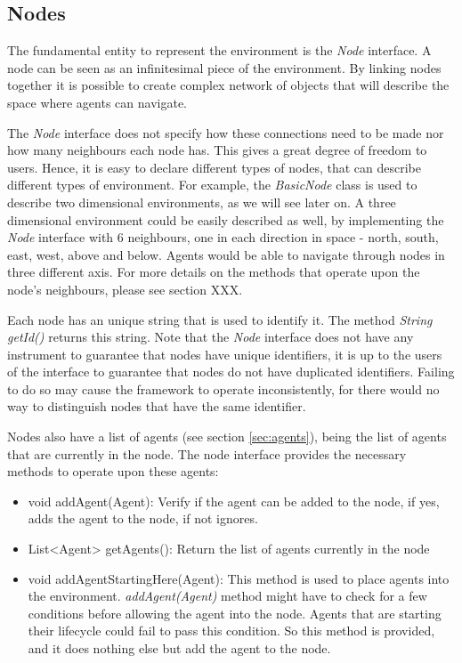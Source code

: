 \subsection{Nodes}

The fundamental entity to represent the environment is the \emph{Node} interface. A node can be seen as an infinitesimal piece of the environment. By linking nodes together it is possible to create complex network of objects that will describe the space where agents can navigate.

The \emph{Node} interface does not specify how these connections need to be made nor how many neighbours each node has. This gives a great degree of freedom to users. Hence, it is easy to declare different types of nodes, that can describe different types of environment. For example, the \emph{BasicNode} class is used to describe two dimensional environments, as we will see later on. A three dimensional environment could be easily described as well, by implementing the \emph{Node} interface with 6 neighbours, one in each direction in space - north, south, east, west, above and below. Agents would be able to navigate through nodes in three different axis. For more details on the methods that operate upon the node's neighbours, please see section XXX.

Each node has an unique string that is used to identify it. The method \emph{String getId()} returns this string. Note that the \emph{Node} interface does not have any instrument to guarantee that nodes have unique identifiers, it is up to the users of the interface to guarantee that nodes do not have duplicated identifiers. Failing to do so may cause the framework to operate inconsistently, for there would no way to distinguish nodes that have the same identifier. 

Nodes also have a list of agents (see section \ref{sec:agents}), being the list of agents that are currently in the node. The node interface provides the necessary methods to operate upon these agents:

\begin{itemize}
  \item void addAgent(Agent): Verify if the agent can be added to the node, if yes, adds the agent to the node, if not ignores.
  \item List<Agent> getAgents(): Return the list of agents currently in the node
  \item void addAgentStartingHere(Agent): This method is used to place agents into the environment. \emph{addAgent(Agent)} method might have to check for a few conditions before allowing the agent into the node. Agents that are starting their lifecycle could fail to pass this condition. So this method is provided, and it does nothing else but add the agent to the node.
\end{itemize}

